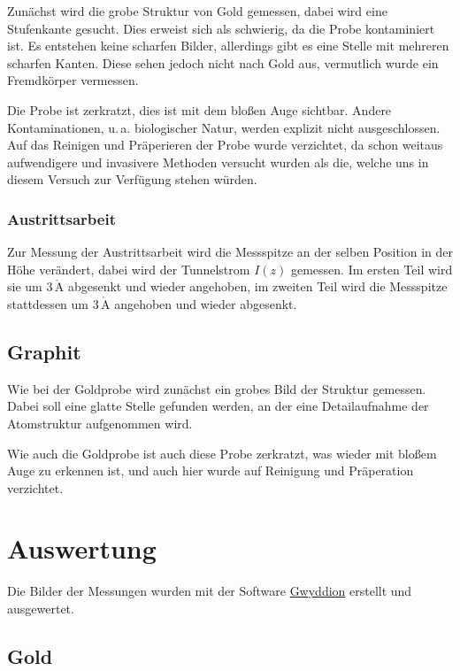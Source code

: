 \documentclass[12pt,a4paper]{scrartcl}
\numberwithin{equation}{section} %
\begin{document}
Zunächst wird die grobe Struktur von Gold gemessen, dabei wird eine Stufenkante gesucht. Dies erweist sich als schwierig, da die Probe kontaminiert ist. Es entstehen keine scharfen Bilder, allerdings gibt es eine Stelle mit mehreren scharfen Kanten. Diese sehen jedoch nicht nach Gold aus, vermutlich wurde ein Fremdkörper vermessen.

Die Probe ist zerkratzt, dies ist mit dem bloßen Auge sichtbar. Andere Kontaminationen, u.\,a. biologischer Natur, werden explizit nicht ausgeschlossen. Auf das Reinigen und Präperieren der Probe wurde verzichtet, da schon weitaus aufwendigere und invasivere Methoden versucht wurden als die, welche uns in diesem Versuch zur Verfügung stehen würden.

\hypertarget{austrittsarbeit}{%
\subsubsection{Austrittsarbeit}\label{austrittsarbeit}}

Zur Messung der Austrittsarbeit wird die Messspitze an der selben Position in der Höhe verändert, dabei wird der Tunnelstrom $I(z)$ gemessen. Im ersten Teil wird sie um $3\,\mathrm{\mathring{A}}$ abgesenkt und wieder angehoben, im zweiten Teil wird die Messspitze stattdessen um $3\,\mathrm{\mathring{A}}$ angehoben und wieder abgesenkt.

\hypertarget{graphit}{%
\subsection{Graphit}\label{graphit}}

Wie bei der Goldprobe wird zunächst ein grobes Bild der Struktur gemessen. Dabei soll eine glatte Stelle gefunden werden, an der eine Detailaufnahme der Atomstruktur aufgenommen wird.

Wie auch die Goldprobe ist auch diese Probe zerkratzt, was wieder mit bloßem Auge zu erkennen ist, und auch hier wurde auf Reinigung und Präperation verzichtet.

\clearpage
\hypertarget{auswertung}{%
\section{Auswertung}\label{auswertung}}
Die Bilder der Messungen wurden mit der Software \href{http://gwyddion.net}{Gwyddion} \cite{Gwyddion} erstellt und ausgewertet.

\hypertarget{gold-1}{%
\subsection{Gold}\label{gold-1}}
\end{document}
